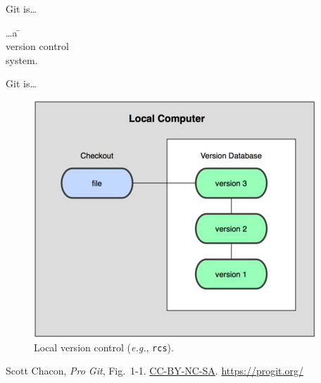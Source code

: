 \begin{frame}{Git is\ldots}
  \huge {
    \begin{tabbing}
      \ldots a \= \color{ucMaroon}{distributed} \\
      \> version control \\
      \> system.
    \end{tabbing}
  }
\end{frame}

\begin{frame}{Git is\ldots}
  \begin{figure}
    \includegraphics[scale=0.8]{18333fig0101-tn.png}
    \\ Local version control (\emph{e.g.}, \texttt{rcs}).
  \end{figure}
  \footnotesize{Scott Chacon,
    \emph{Pro Git},
    Fig.~1-1.
    \href{https://creativecommons.org/licenses/by-nc-sa/3.0/legalcode}{CC-BY-NC-SA}.
    \href{https://progit.org/}{https://progit.org/}}

\end{frame}

